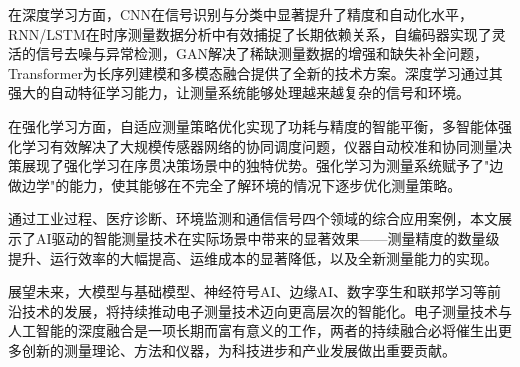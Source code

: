 \documentclass[12pt,a4paper]{article}
\numberwithin{figure}{section}
\numberwithin{table}{section}
\numberwithin{equation}{section}
\begin{document}
在深度学习方面，CNN在信号识别与分类中显著提升了精度和自动化水平，RNN/LSTM在时序测量数据分析中有效捕捉了长期依赖关系，自编码器实现了灵活的信号去噪与异常检测，GAN解决了稀缺测量数据的增强和缺失补全问题，Transformer为长序列建模和多模态融合提供了全新的技术方案。深度学习通过其强大的自动特征学习能力，让测量系统能够处理越来越复杂的信号和环境。

在强化学习方面，自适应测量策略优化实现了功耗与精度的智能平衡，多智能体强化学习有效解决了大规模传感器网络的协同调度问题，仪器自动校准和协同测量决策展现了强化学习在序贯决策场景中的独特优势。强化学习为测量系统赋予了"边做边学"的能力，使其能够在不完全了解环境的情况下逐步优化测量策略。

通过工业过程、医疗诊断、环境监测和通信信号四个领域的综合应用案例，本文展示了AI驱动的智能测量技术在实际场景中带来的显著效果——测量精度的数量级提升、运行效率的大幅提高、运维成本的显著降低，以及全新测量能力的实现。

展望未来，大模型与基础模型、神经符号AI、边缘AI、数字孪生和联邦学习等前沿技术的发展，将持续推动电子测量技术迈向更高层次的智能化。电子测量技术与人工智能的深度融合是一项长期而富有意义的工作，两者的持续融合必将催生出更多创新的测量理论、方法和仪器，为科技进步和产业发展做出重要贡献。

\newpage
\end{document}
